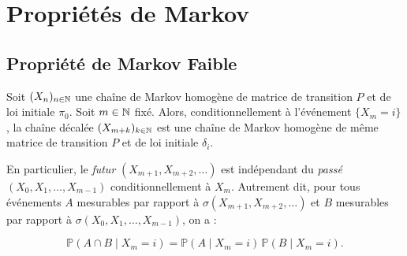 \section{Propriétés de Markov}

\subsection{Propriété de Markov Faible}

\begin{theorem}
    Soit $(X_n)_{n \in \mathbb{N}}$ une chaîne de Markov homogène de matrice de transition $P$ et de loi initiale 
    $ \pi_0$. Soit $ m \in \mathbb{N}$ fixé. Alors, conditionnellement à l’événement $\{X_m = i\}$, la chaîne décalée 
    $(X_{m+k})_{k \in \mathbb{N}}$ est une chaîne de Markov homogène de même matrice de transition $P$ et de loi initiale 
    $\delta_i$.

    \vspace{0.3cm}

    En particulier, le \emph{futur} $(X_{m+1}, X_{m+2}, \dots)$ est indépendant du \emph{passé} 
    $(X_0, X_1, \dots, X_{m-1})$ conditionnellement à $X_m$. Autrement dit, pour tous événements $A$ mesurables 
    par rapport à $\sigma(X_{m+1}, X_{m+2}, \dots)$ et $B$ mesurables par rapport à 
    $\sigma(X_0, X_1, \dots, X_{m-1})$, on a :
    
    \[
        \mathbb{P}(A \cap B \mid X_m = i)
        = \mathbb{P}(A \mid X_m = i)\,\mathbb{P}(B \mid X_m = i).
    \]
\end{theorem}

